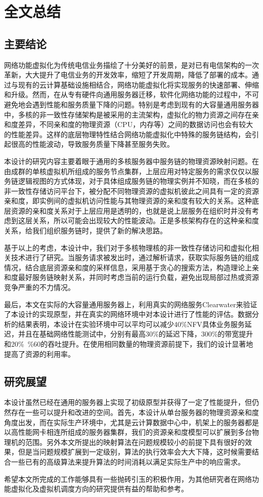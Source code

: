 \chapter{全文总结}
\label{chapter:conclusion}

\section{主要结论}
网络功能虚拟化为传统电信业务描绘了十分美好的前景，是对已有电信架构的一次革新，大大提升了电信业务的开发效率，缩短了开发周期，降低了部署的成本。通过与现有的云计算基础设施相结合，网络功能虚拟化将实现服务的快速部署、伸缩和升级。然而，在从专有硬件向通用服务器迁移，软件化网络功能的过程中，不可避免地会遇到性能和服务质量下降的问题。特别是考虑到现有的大容量通用服务器中，多核的非一致性存储架构是被采用的主流架构，虚拟化的物力资源之间存在亲和度差异，不同亲和度的物理资源（CPU，内存等）之间的数据访问也会有较大的性能差异。这样的底层物理特性结合网络功能虚拟化中特殊的服务链结构，会引起很高的性能波动，导致服务质量下降甚至服务失败。

本设计的研究内容主要着眼于通用的多核服务器中服务链的物理资源映射问题。在由成群的单核虚拟机所组成的服务节点集群，上层应用对特定服务的需求仅仅以服务链逻辑视图的方式体现，对于具体组成服务链的物理实例并不知晓，而在多核的非一致性存储访问平台下，被分配不同物理资源的虚拟机彼此之间具有一定的资源亲和度，即实例间的虚拟机访问性能与其物理资源的亲和度有较大的关系。这种底层资源的亲和度关系对于上层应用是透明的，也就是说上层服务在组织时并没有考虑到这层关系，所以可能会出现较大的性能波动。正是多核架构存在的这种亲和度关系，给我们组织服务链时，提供了新的解决思路。

基于以上的考虑，本设计中，我们对于多核物理核的非一致性存储访问和虚拟化相关技术进行了研究。当服务请求被发出时，通过解析请求，获取实际服务链的组成情况，结合底层资源亲和度的采样信息，采用基于贪心的搜索方法，构造理论上亲和度最好服务链映射关系，并同时考虑当前的运行负载，避免出现局部过热或资源竞争严重的不力情况。

最后，本文在实际的大容量通用服务器上，利用真实的网络服务Clearwater来验证了本设计的实现原型，并在真实的网络环境中对本设计进行了性能的评估。数据分析的结果表明，本设计在实验环境中可以平均可以减少40\%NFV具体业务服务延迟，并且在基础网络性能测试中，分别有最高30\%的延迟下降，300\%的带宽提升和20\%~\%60的吞吐提升。在使用相同数量的物理资源前提下，我们的设计显著地提高了资源的利用率。

\section{研究展望}
本设计虽然已经在通用的服务器上实现了初级原型并获得了一定了性能提升，但仍然存在一些可以提升和改进的空间。首先，本设计从单台服务器的物理资源亲和度角度出发，而在实际生产环境中，尤其是云计算数据中心中，机架上的服务器都是以高性能网卡相连所组成的服务器集群，我们的资源亲和度模型可以扩展到多台物理机的范围。另外本文所提出的映射算法在问题规模较小的前提下具有很好的效果，但是当问题规模扩展到一定级别，算法的执行效率会大大下降，这时候需要结合一些已有的高级算法来提升算法的时间消耗以满足实际生产中的响应需求。

希望本文所完成的工作能够具有一些抛砖引玉的积极作用，为其他研究者在网络功能虚拟化及虚拟机调度方向的研究提供有益的帮助和参考。
